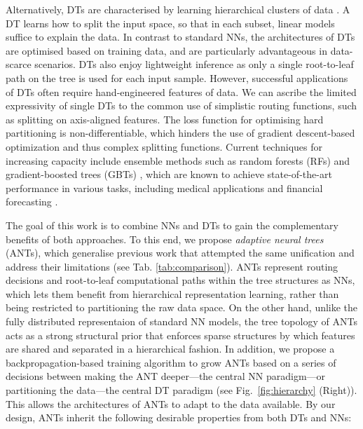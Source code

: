 Alternatively, DTs are characterised by learning hierarchical clusters of data \cite{criminisi2013decision}. A DT learns how to split the input space, so that in each subset, linear models suffice to explain the data. In contrast to standard NNs, the architectures of DTs are optimised based on training data, and are particularly advantageous in data-scarce scenarios. DTs also enjoy lightweight inference as only a single root-to-leaf path on the tree is used for each input sample. However, successful applications of DTs often require hand-engineered features of data. We can ascribe the limited expressivity of single DTs to the common use of simplistic routing functions, such as splitting on axis-aligned features. The loss function for optimising hard partitioning is non-differentiable, which hinders the use of gradient descent-based optimization and thus complex splitting functions. Current techniques for increasing capacity include ensemble methods such as random forests (RFs) \cite{breiman2001random} and gradient-boosted trees (GBTs) \cite{friedman2001greedy}, which are known to achieve state-of-the-art performance in various tasks, including medical applications and financial forecasting \cite{sandulescu2016predicting,kaggle2017,le2016lifted,volkovs2017content}.

The goal of this work is to combine NNs and DTs to gain the complementary benefits of both approaches. To this end, we propose \textit{adaptive neural trees} (ANTs), which generalise previous work that attempted the same unification \cite{suarez1999globally,irsoy2012soft,laptev2014convolutional,rota2014neural,kontschieder2015deep,frosst2017distilling,xiao2017ndt} and address their limitations (see Tab. \ref{tab:comparison}). 
ANTs represent routing decisions and root-to-leaf computational paths within the tree structures as NNs, which lets them benefit from hierarchical representation learning, rather than being restricted to partitioning the raw data space. On the other hand, unlike the fully distributed representaion of standard NN models, the tree topology of ANTs acts as a strong structural prior that enforces sparse structures by which features are shared and separated in a hierarchical fashion. In addition, we propose a backpropagation-based training algorithm to grow ANTs based on a series of decisions between making the ANT deeper---the central NN paradigm---or partitioning the data---the central DT paradigm (see Fig.~\ref{fig:hierarchy} (Right)). This allows the architectures of ANTs to adapt to the data available. By our design, ANTs inherit the following desirable properties from both DTs and NNs:

